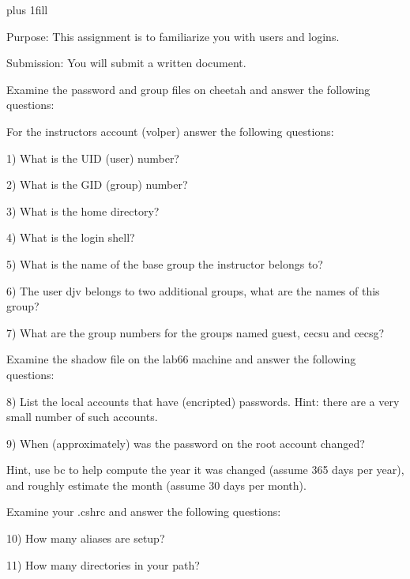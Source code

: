 
\rightskip=0pt plus 1fill

\parindent 0pt

Purpose: This assignment is to familiarize you with users and logins.

Submission: You will submit a written document.

Examine the password and group files on {\ltt{}cheetah}
and answer the following questions:

For the instructors account ({\ltt{}volper}) answer the following
questions:

1) What is the UID (user) number?

2) What is the GID (group) number?

3) What is the home directory?

4) What is the login shell?

5) What is the name of the base group the instructor belongs to?

6) The user {\ltt{}djv} belongs to two additional groups,
what are the names of this group?

7) What are the group numbers for the groups named {\ltt{}guest},
{\ltt{}cecsu} and {\ltt{}cecsg}?

Examine the shadow file on the {\ltt{}lab66} machine
and answer the following questions:

8) List the local accounts that have (encripted) passwords.
Hint: there are a very small number of such accounts.

9) When (approximately) was the password on the root account changed?

Hint, use bc to help compute the year it was changed (assume
365 days per year), and roughly estimate the month 
(assume 30 days per month).

Examine your {\ltt{}.cshrc} and answer the following questions:

10) How many aliases are setup?

11) How many directories in your path?

\bye
